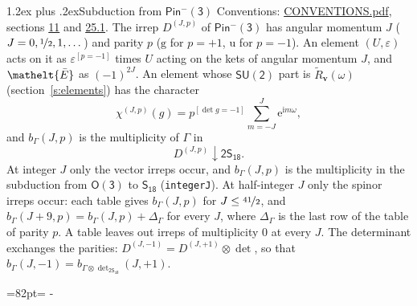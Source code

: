 \documentclass[10pt,a4paper]{article}
\makeatletter
\renewcommand\section{\@startsection{section}{1}{\z@}{-3ex plus -1ex minus -.2ex}%
  {1.2ex plus .2ex}{\normalfont\large\sffamily\bfseries\color{parttitle}}}
\newcommand{\needspace}[1]{\par\penalty-100\begingroup\dimen0=#1\relax\dimen2=\pagegoal
  \advance\dimen2-\pagetotal\ifdim\dimen0>\dimen2\relax\ifdim\dimen2>0pt\vfil\break\fi\fi
  \endgroup}
\numberwithin{equation}{section}
\newcommand{\eltfont}[1]{{\let\sigma\eltsigma\mathelt{#1}}}
\newcommand{\grp}[1]{\mathsf{#1}}
\newcommand{\elt}[1]{\eltfont{#1}}
\newcommand{\ptag}[1]{\mathrm{#1}}
\newcommand{\iverson}[1]{[#1]}
\newcommand{\restr}[2]{#1\!\downarrow#2}
\newcommand{\vv}{\mathbf{v}}
\newcommand{\iunit}{\mathrm{i}}
\newcommand{\expe}{\mathrm{e}}
\newcommand{\irrJp}[2]{D^{(#1,#2)}}
\newcommand{\irrprod}{\otimes}
\newcommand{\barred}[1]{\bar{#1}}
\newcommand{\lift}[1]{\tilde{#1}}
\makeatother
\begin{document}
\section{Subduction from \texorpdfstring{$\grp{Pin^{-}(3)}$}{Pin(3)}}\label{s:subduction_parent}
Conventions: \href{../../CONVENTIONS.pdf}{CONVENTIONS.pdf}, sections \href{../../../rotation/CONVENTIONS.pdf\#conv.11}{11} and \href{../../CONVENTIONS.pdf\#conv.25.1}{25.1}.
\leavevmode\label{n:index.J}\label{n:index.parity}\label{n:irrep.o3}The irrep $\irrJp{J}{p}$ of \href{Pinminus3.pdf}{$\grp{Pin^{-}(3)}$} has angular momentum $J$ ($J = 0, \nicefrac{1}{2}, 1, \dots$) and parity $p$ ($\ptag{g}$ for $p = +1$, $\ptag{u}$ for $p = -1$). An element $(U, \varepsilon)$ acts on it as $\varepsilon^{[p = -1]}$ times $U$ acting on the kets of angular momentum $J$, and $\elt{\barred{E}}$ as $(-1)^{2J}$. \label{n:function.character.parent}\label{n:function.multiplicity}An element whose $\grp{SU(2)}$ part is $\lift{R}_{\vv}(\omega)$ (section~\ref{s:elements}) has the character
\begin{equation}\label{e:chi}\chi^{(J,p)}(g) = p^{\iverson{\det g = -1}}\sum_{m=-J}^{J} \expe^{\iunit m\omega},\end{equation}
and $b_\Gamma(J, p)$ is the multiplicity of $\Gamma$ in
\begin{equation}\label{e:parent}\restr{\irrJp{J}{p}}{\grp{2S_{18}}}.\end{equation}
At integer $J$ only the vector irreps occur, and $b_\Gamma(J, p)$ is the multiplicity in the subduction from $\grp{O(3)}$ to \href{../../../rotation/data/pdf/S18.pdf}{$\grp{S_{18}}$} (\texttt{integerJ}). \label{n:index.increment}At half-integer $J$ only the spinor irreps occur: each table gives $b_\Gamma(J, p)$ for $J \le \nicefrac{41}{2}$, and $b_\Gamma(J + 9, p) = b_\Gamma(J, p) + \Delta_\Gamma$ for every $J$, where $\Delta_\Gamma$ is the last row of the table of parity $p$. A table leaves out irreps of multiplicity 0 at every $J$.
\leavevmode\label{n:operator.determinant.character}The determinant exchanges the parities: $\irrJp{J}{-1} = \irrJp{J}{+1} \irrprod \det$, so that $b_\Gamma(J, -1) = b_{\Gamma \irrprod \det_{\grp{2S_{18}}}}(J, +1)$.
\needspace{82pt}
\end{document}
